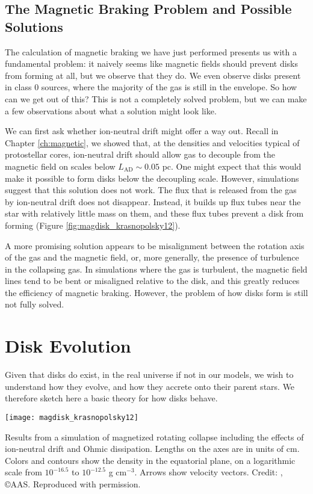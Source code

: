 \subsection{The Magnetic Braking Problem and Possible Solutions}

The calculation of magnetic braking we have just performed presents us with a fundamental problem: it naively seems like magnetic fields should prevent disks from forming at all, but we observe that they do. We even observe disks present in class 0 sources, where the majority of the gas is still in the envelope. So how can we get out of this? This is not a completely solved problem, but we can make a few observations about what a solution might look like.

We can first ask whether ion-neutral drift might offer a way out. Recall in Chapter \ref{ch:magnetic}, we showed that, at the densities and velocities typical of protostellar cores, ion-neutral drift should allow gas to decouple from the magnetic field on scales below $L_{\mathrm{AD}} \sim 0.05$ pc. One might expect that this would make it possible to form disks below the decoupling scale. However, simulations suggest that this solution does not work. The flux that is released from the gas by ion-neutral drift does not disappear. Instead, it builds up flux tubes near the star with relatively little mass on them, and these flux tubes prevent a disk from forming (Figure \ref{fig:magdisk_krasnopolsky12}).

A more promising solution appears to be misalignment between the rotation axis of the gas and the magnetic field, or, more generally, the presence of turbulence in the collapsing gas. In simulations where the gas is turbulent, the magnetic field lines tend to be bent or misaligned relative to the disk, and this greatly reduces the efficiency of magnetic braking. However, the problem of how disks form is still not fully solved.

\section{Disk Evolution}

Given that disks do exist, in the real universe if not in our models, we wish to understand how they evolve, and how they accrete onto their parent stars. We therefore sketch here a basic theory for how disks behave.

\begin{marginfigure}
\texttt{[image: magdisk\_krasnopolsky12]}
\caption[Simulations of magnetized rotating collapse with non-ideal MHD]{
\label{fig:magdisk_krasnopolsky12}
Results from a simulation of magnetized rotating collapse including the effects of ion-neutral drift and Ohmic dissipation. Lengths on the axes are in units of cm. Colors and contours show the density in the equatorial plane, on a logarithmic scale from $10^{-16.5}$ to $10^{-12.5}$ g cm$^{-3}$. Arrows show velocity vectors. Credit: \citet{krasnopolsky12a}, \copyright AAS. Reproduced with permission.
}
\end{marginfigure}

